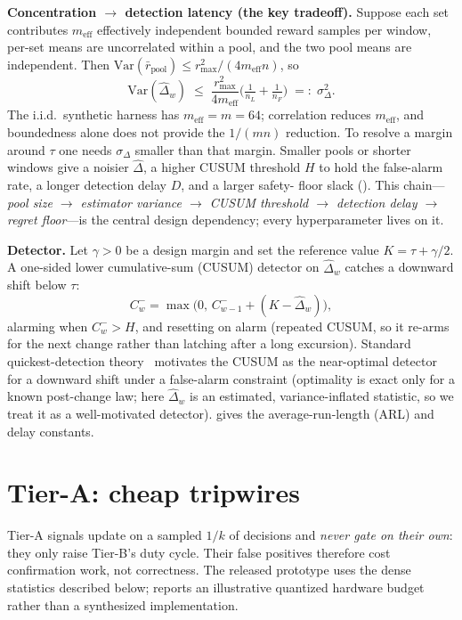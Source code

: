 \documentclass{article}
\newcommand{\dhat}{\hat{\Delta}}
\newcommand{\rmax}{r_{\max}}
\newcommand{\sigd}{\sigma_{\Delta}}
\begin{document}
\textbf{Concentration $\to$ detection latency (the key tradeoff).} Suppose each
set contributes $m_{\mathrm{eff}}$ effectively independent bounded reward samples
per window, per-set means are uncorrelated within a pool, and the two pool means
are independent. Then
$\mathrm{Var}(\bar r_{\text{pool}})\le \rmax^2/(4m_{\mathrm{eff}}n)$, so
\begin{equation}\label{eq:var}
\mathrm{Var}(\dhat_w)\;\le\;\frac{\rmax^2}{4m_{\mathrm{eff}}}\Big(\tfrac{1}{n_L}+\tfrac{1}{n_F}\Big)
\;=:\;\sigd^2 .
\end{equation}
The i.i.d.\ synthetic harness has $m_{\mathrm{eff}}=m=64$; correlation reduces
$m_{\mathrm{eff}}$, and boundedness alone does not provide the $1/(mn)$ reduction.
To resolve a margin around $\tau$ one needs $\sigd$ smaller than that margin. Smaller
pools or shorter windows give a noisier $\dhat$, a higher CUSUM threshold $H$ to
hold the false-alarm rate, a longer detection delay $D$, and a larger safety-
floor slack (). This chain---\emph{pool size $\to$ estimator
variance $\to$ CUSUM threshold $\to$ detection delay $\to$ regret floor}---is the
central design dependency; every hyperparameter lives on it.

\textbf{Detector.} Let $\gamma>0$ be a design margin and set the reference value
$K=\tau+\gamma/2$. A one-sided lower cumulative-sum (CUSUM) detector on $\dhat_w$
catches a downward shift below $\tau$:
\begin{equation}
C^-_w=\max\!\big(0,\,C^-_{w-1}+(K-\dhat_w)\big),
\end{equation}
alarming when $C^-_w>H$, and resetting on alarm (repeated CUSUM, so it re-arms
for the next change rather than latching after a long excursion). Standard
quickest-detection theory~\citep{lorden1971reacting,moustakides1986optimal}
motivates the CUSUM as the near-optimal detector for a downward shift under a
false-alarm constraint (optimality is exact only for a known post-change law;
here $\dhat_w$ is an estimated, variance-inflated statistic, so we treat it as a
well-motivated detector).  gives the average-run-length (ARL)
and delay constants.

\section{Tier-A: cheap tripwires}\label{sec:tiera}
Tier-A signals update on a sampled $1/k$ of decisions and \emph{never gate on
their own}: they only raise Tier-B's duty cycle. Their false positives therefore
cost confirmation work, not correctness. The released prototype uses the dense
statistics described below;  reports an illustrative quantized
hardware budget rather than a synthesized implementation.
\end{document}
